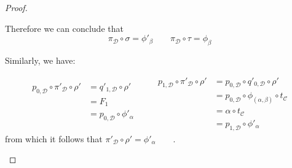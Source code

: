 \documentclass[a4paper,UKenglish,cleveref,pdftex,thm-restate,numberwithinsect]{lipics-v2021}
\begin{document}
\begin{proof}
\begin{enumerate}
\begin{itemize}
			Therefore we can conclude that
			\[\pi_{\mathcal{D}}\circ \sigma = \phi'_\beta \qquad \pi_{\mathcal{D}}\circ \tau = \phi_\beta \]
			
			
			Similarly, we have:
			
			\[\begin{split}
				p_{0, \mathcal{D}}\circ \pi'_{\mathcal{D}}\circ \rho' &= q'_{1, \mathcal{D}}\circ \rho' \\&=F_1\\&=p_{0, \mathcal{D}}\circ  \phi'_{\alpha} \\ & \end{split} \qquad\begin{split}
				p_{1, \mathcal{D}}\circ \pi'_{\mathcal{D}}\circ \rho' &=  p_{0, \mathcal{D}}\circ q'_{0, \mathcal{D}} \circ  \rho' \\&=p_{0, \mathcal{D}}\circ \phi_{(\alpha, \beta)} \circ t_{\mathcal{C}}\\&=\alpha \circ t_{\mathcal{C}}\\&=p_{1, \mathcal{D}}\circ \phi'_\alpha\end{split} \] 
			from which it follows that $\pi'_{\mathcal{D}}\circ \rho' =\phi'_\alpha \qquad$.
			

\end{itemize}
\end{enumerate}
\end{proof}
\end{document}

